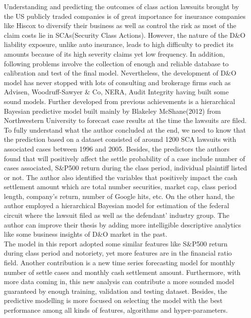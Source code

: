 \indent Understanding and predicting the outcomes of class action lawsuits brought by the US publicly traded companies is of great importance for insurance companies like Hiscox to diversify their business as well as control the risk as most of the claim costs lie in SCAs(Security Class Actions). However, the nature of the D\&O liability exposure, unlike auto insurance, leads to high difficulty to predict its amounts because of its high severity claims yet low frequency. In addition, following problems involve the collection of enough and reliable database to calibration and test of the final model. Nevertheless, the development of D\&O model has never stopped with lots of consulting and brokerage firms such as Advisen, Woodruff-Sawyer \& Co, NERA, Audit Integrity having built some sound models. Further developed from previous achievements is a hierarchical Bayesian predictive model built mainly by Blakeley McShane(2012) \hl{\cite{2}} from Northwestern University to forecast case results at the time the lawsuits are filed. To fully understand what the author concluded at the end, we need to know that the prediction based on a dataset consisted of around 1200 SCA lawsuits with associated cases between 1996 and 2005. Besides, the predictors the authors found that will positively affect the settle probability of a case include number of cases associated, S\&P500 return during the class period, individual plaintiff listed or not. The author also identified the variables that positively impact the cash settlement amount which are total number securities, market cap, class period length, company's return, number of Google hits, etc. On the other hand, the author employed a hierarchical Bayesian model for estimation of the federal circuit where the lawsuit filed as well as the defendant' industry group. The author can improve their thesis by adding more intelligible descriptive analytics like some business insights of D\&O market in the past. \\
\indent The model in this report adopted some similar features like S\&P500 return during class period and notoriety, yet more features are in the financial ratio field. Another contribution is a new time series forecasting model for monthly number of settle cases and monthly cash settlement amount. Furthermore, with more data coming in, this new analysis can contribute a more sounded model guaranteed by enough training, validation and testing dataset. Besides, the predictive modelling is more focused on selecting the model with the best performance among all kinds of features, algorithms and hyper-parameters.\\
